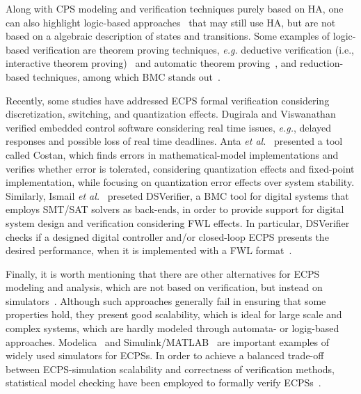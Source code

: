 \documentclass[format=acmsmall, review=false, screen=true]{acmart}
\begin{document}
Along with CPS modeling and verification techniques purely based on HA, one can also highlight logic-based approaches~\cite{Phan15} that may still use HA, but are not based on a algebraic description of states and transitions. Some examples of logic-based verification are theorem proving techniques, {\it e.g.} deductive verification (i.e., interactive theorem proving)~\cite{Nipkow02} and automatic theorem proving~\cite{Platzer07}, and reduction-based techniques, among which BMC stands out~\cite{handbook09}.
 

Recently, some studies have addressed ECPS formal verification considering discretization, switching, and quantization effects.  Dugirala and Viswanathan~\cite{Duggirala2015} verified embedded control software considering real time issues, {\it e.g.}, delayed responses and possible loss of real time deadlines. Anta {\it et al.}~\cite{Anta10} presented a tool called Costan, which finds errors in mathematical-model implementations and verifies whether error is tolerated, considering quantization effects and fixed-point implementation, while focusing on quantization error effects over system stability. Similarly, Ismail {\it et al.}~\cite{dsv_spin2015} preseted DSVerifier, a BMC tool for digital systems that employs SMT/SAT solvers as back-ends, in order to provide support for digital system design and verification considering FWL effects. In particular, DSVerifier checks if a designed digital controller and/or closed-loop ECPS presents the desired performance, when it is implemented with a FWL format~\cite{Bessa16,Bessa17}.

Finally, it is worth mentioning that there are other alternatives for ECPS modeling and analysis, which are not based on verification, but instead on simulators~\cite{Phan2014,Nakajima12,Junjie12}. Although such approaches generally fail in ensuring that some properties hold, they present good scalability, which is ideal for large scale and complex systems, which are hardly modeled through automata- or logig-based approaches. Modelica~\cite{Junjie12} and Simulink/MATLAB~\cite{Nakajima12} are important examples of widely used simulators for ECPSs. In order to achieve a balanced trade-off between ECPS-simulation scalability and correctness of verification methods, statistical model checking have been employed to formally verify ECPSs~\cite{Clarke11}.
\end{document}
